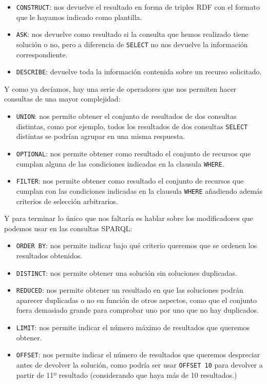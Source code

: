\begin{itemize}
	\item {\tt CONSTRUCT}: nos devuelve el resultado en forma de triples {\sf RDF} con el formato que le hayamos indicado como plantilla.
	\item {\tt ASK}: nos devuelve como resultado si la consulta que hemos realizado tiene solución o no, pero a diferencia de {\tt SELECT} no nos devuelve la información correspondiente.
	\item {\tt DESCRIBE}: devuelve toda la información contenida sobre un recurso solicitado.
\end{itemize}

Y como ya decíamos, hay una serie de operadores que nos permiten hacer consultas de una mayor complejidad:

\begin{itemize}
	\item {\tt UNION}: nos permite obtener el conjunto de resultados de dos consultas distintas, como por ejemplo, todos los resultados de dos consultas {\tt SELECT} distintas se podrían agrupar en una misma respuesta.
	\item {\tt OPTIONAL}: nos permite obtener como resultado el conjunto de recursos que cumplan alguna de las condiciones indicadas en la clausula {\tt WHERE}.
	\item {\tt FILTER}: nos permite obtener como resultado el conjunto de recursos que cumplan con las condiciones indicadas en la clausula {\tt WHERE} añadiendo además criterios de selección arbitrarios.
\end{itemize}

Y para terminar lo único que nos faltaría es hablar sobre los modificadores que podemos usar en las consultas {\sf SPARQL}:

\begin{itemize}
	\item {\tt ORDER BY}: nos permite indicar bajo qué criterio queremos que se ordenen los resultados obtenidos.
	\item {\tt DISTINCT}: nos permite obtener una solución sin soluciones duplicadas.
	\item {\tt REDUCED}: nos permite obtener un resultado en que las soluciones podrán aparecer duplicadas o no en función de otros aspectos, como que el conjunto fuera demasiado grande para comprobar uno por uno que no hay duplicados.
	\item {\tt LIMIT}: nos permite indicar el número máximo de resultados que queremos obtener.
	\item {\tt OFFSET}: nos permite indicar el número de resultados que queremos despreciar antes de devolver la solución, como podría ser usar {\tt OFFSET 10} para devolver a partir de 11º resultado (considerando que haya más de 10 resultados.)
\end{itemize}

